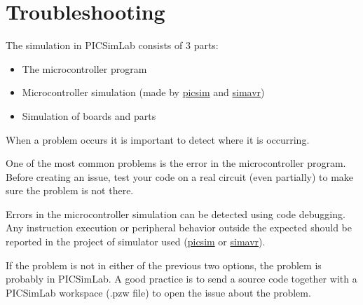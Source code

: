 
\chapter{Troubleshooting}

The simulation in PICSimLab consists of 3 parts:

\begin{itemize}
 \item The microcontroller program
 \item Microcontroller simulation (made by \href{https://github.com/lcgamboa/picsim}{picsim} and \href{https://github.com/buserror/simavr}{simavr})
 \item Simulation of boards and parts
\end{itemize}


When a problem occurs it is important to detect where it is occurring.

One of the most common problems is the error in the microcontroller program. 
Before creating an issue, test your code on a real circuit (even partially) to make sure the problem 
is not there.

Errors in the microcontroller simulation can be detected using code debugging. Any instruction 
execution or peripheral behavior outside the expected should be reported in the project of simulator
used (\href{https://github.com/lcgamboa/picsim}{picsim} or \href{https://github.com/buserror/simavr}{simavr}).

If the problem is not in either of the previous two options, the problem is probably in PICSimLab.
A good practice is to send a source code together with a PICSimLab workspace (.pzw file) to open the
issue about the problem.

